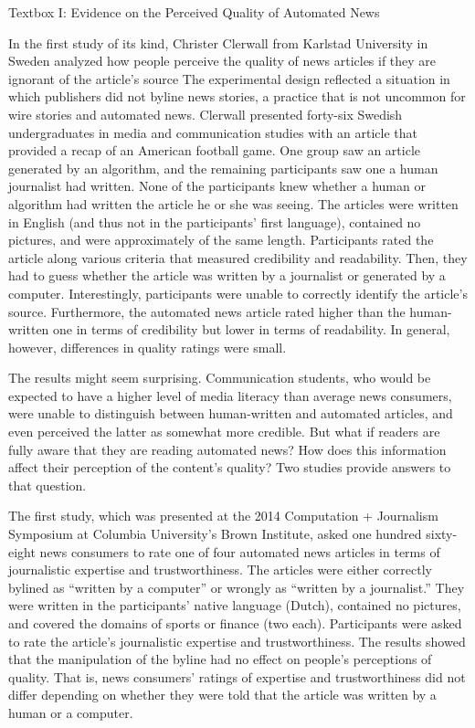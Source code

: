 \documentclass[notoc, symmetric, nobib, nols]{towcenter-book}
\begin{document}
\begin{framed}
Textbox I: Evidence on the Perceived Quality of Automated News 

In the first study of its kind, Christer Clerwall from Karlstad University in Sweden analyzed how people perceive the quality of news articles if they are ignorant of the article’s source\cite{clerwall15} The experimental design reflected a situation in which publishers did not byline news stories, a practice that is not uncommon for wire stories and automated news.\cite{ulanoff14} Clerwall presented forty-six Swedish undergraduates in media and communication studies with an article that provided a recap of an American football game. One group saw an article generated by an algorithm, and the remaining participants saw one a human journalist had written. None of the participants knew whether a human or algorithm had written the article he or she was seeing. The articles were written in English (and thus not in the participants’ first language), contained no pictures, and were approximately of the same length. Participants rated the article along various criteria that measured credibility and readability. Then, they had to guess whether the article was written by a journalist or generated by a computer. Interestingly, participants were unable to correctly identify the article’s source. Furthermore, the automated news article rated higher than the human-written one in terms of credibility but lower in terms of readability. In general, however, differences in quality ratings were small.

The results might seem surprising. Communication students, who would be expected to have a higher level of media literacy than average news consumers, were unable to distinguish between human-written and automated articles, and even perceived the latter as somewhat more credible. But what if readers are fully aware that they are reading automated news? How does this information affect their perception of the content’s quality? Two studies provide answers to that question. 

The first study, which was presented at the 2014 Computation + Journalism Symposium at Columbia University’s Brown Institute, asked one hundred sixty-eight news consumers to rate one of four automated news articles in terms of journalistic expertise and trustworthiness.\cite{kaa14} The articles were either correctly bylined as ``written by a computer'' or wrongly as ``written by a journalist.'' They were written in the participants’ native language (Dutch), contained no pictures, and covered the domains of sports or finance (two each). Participants were asked to rate the article’s journalistic expertise and trustworthiness. The results showed that the manipulation of the byline had no effect on people’s perceptions of quality. That is, news consumers’ ratings of expertise and trustworthiness did not differ depending on whether they were told that the article was written by a human or a computer. 


\end{framed}
\end{document}
